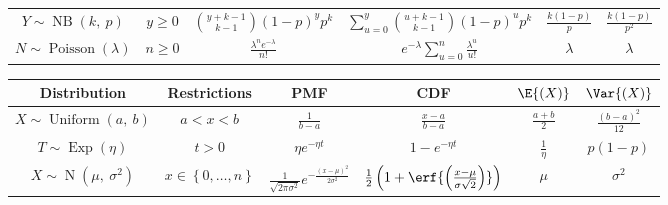 \documentclass{article}
\begin{document}
\begin{table}[H]
\begin{tabular}{c c c c c c}
        \( Y \sim \operatorname{NB}{\left( k,\: p \right)}\)       & \(y \geq 0\)                                           & \(\binom{y + k - 1}{k - 1} \left( 1 - p \right)^y p^k\)   & \(\sum_{u = 0}^y \binom{u + k - 1}{k - 1} \left( 1 - p \right)^u p^k\)   & \(\frac{k\left( 1 - p \right)}{p}\) & \(\frac{k\left( 1 - p \right)}{p^2}\)         \\
        \( N \sim \operatorname{Poisson}{\left( \lambda \right)}\) & \(n \geq 0\)                                           & \(\frac{\lambda^n e^{-\lambda}}{n!}\)                     & \(e^{-\lambda} \sum_{u = 0}^n \frac{\lambda^u}{u!}\)                     & \(\lambda\)                         & \(\lambda\)                                   \\
        \bottomrule
    \end{tabular}
\end{table}
\begin{table}[H]
    \centering
    \begin{tabular}{c c c c c c}
        \toprule
        \textbf{Distribution}                                       & \textbf{Restrictions}                  & \textbf{PMF}                                                                         & \textbf{CDF}                                                                            & \(\E{\left( X \right)}\) & \(\Var{\left( X \right)}\)            \\
        \midrule
        \(X \sim \operatorname{Uniform}{\left( a,\: b \right)}\)    & \(a < x < b\)                          & \(\frac{1}{b - a}\)                                                                  & \(\frac{x - a}{b - a}\)                                                                 & \(\frac{a + b}{2}\)      & \(\frac{\left( b - a \right)^2}{12}\) \\
        \(T \sim \operatorname{Exp}{\left( \eta \right)}\)          & \(t > 0\)                              & \(\eta e^{-\eta t}\)                                                                 & \(1 - e^{-\eta t}\)                                                                     & \(\frac{1}{\eta}\)       & \(p \left( 1 - p \right)\)            \\
        \(X \sim \operatorname{N}{\left( \mu,\: \sigma^2 \right)}\) & \(x \in \left\{ 0, \dots, n \right\}\) & \(\frac{1}{\sqrt{2 \pi \sigma^2}} e^{-\frac{\left( x - \mu \right)^2}{2 \sigma^2}}\) & \(\frac{1}{2} \left( 1 + \erf{\left( \frac{x - \mu}{\sigma \sqrt{2}} \right)} \right)\) & \(\mu\)                  & \(\sigma^2\)                          \\
        \bottomrule
    \end{tabular}
\end{table}
\end{document}
